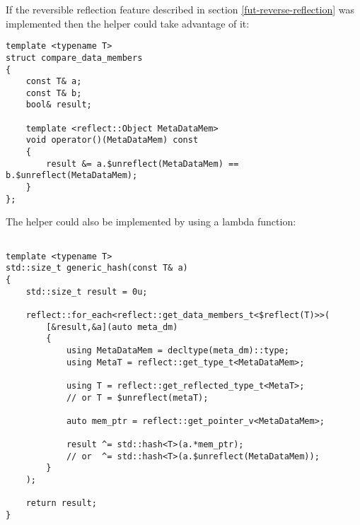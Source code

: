 If the reversible reflection feature described in section \ref{fut-reverse-reflection}
was implemented then the helper could take advantage of it:

\begin{verbatim}
template <typename T>
struct compare_data_members
{
	const T& a;
	const T& b;
	bool& result;

	template <reflect::Object MetaDataMem>
	void operator()(MetaDataMem) const
	{
		result &= a.$unreflect(MetaDataMem) == b.$unreflect(MetaDataMem);
	}
};
\end{verbatim}

The helper could also be implemented by using a lambda function:

\begin{verbatim}

template <typename T>
std::size_t generic_hash(const T& a)
{
	std::size_t result = 0u;

	reflect::for_each<reflect::get_data_members_t<$reflect(T)>>(
		[&result,&a](auto meta_dm)
		{
			using MetaDataMem = decltype(meta_dm)::type;
			using MetaT = reflect::get_type_t<MetaDataMem>;

			using T = reflect::get_reflected_type_t<MetaT>;
			// or T = $unreflect(metaT);

			auto mem_ptr = reflect::get_pointer_v<MetaDataMem>;

			result ^= std::hash<T>(a.*mem_ptr);
			// or  ^= std::hash<T>(a.$unreflect(MetaDataMem));
		}
	);

	return result;
}
\end{verbatim}

